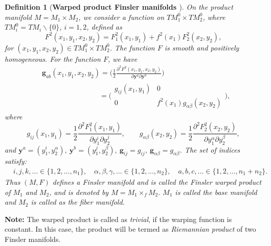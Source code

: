 \documentclass[pdflatex,sn-mathphys-num]{sn-jnl}%
\theoremstyle{thmstyleone}%
\theoremstyle{thmstyletwo}%
\theoremstyle{thmstylethree}%
\newtheorem{definition}{Definition}%
\begin{document}
\begin{definition} [\textbf{Warped product Finsler manifolds \cite[\boldmath p. $10$]{wlt}}]
  On the product manifold $M=M_1\times M_2$, we consider a function on $TM_1^0\times TM_2^0$, where $TM_i^0=TM_i\backslash \{0\}$, $i=1,2$, defined as
	\begin{equation}\label{FM}
		F^2(x_1,y_1,x_2,y_2)=F_1^2(x_1,y_1)+f^2(x_1)F_2^2(x_2,y_2),
	\end{equation}
	for $(x_1,y_1,x_2,y_2)\in TM_1^0\times TM_2^0$. The function $F$ is smooth and positively homogeneous. For the function $F$, we have
	\begin{align}
		&\nonumber\mathbf{g}_{ab}(x_1,y_1,x_2,y_2)=\Bigg(\frac{1}{2}\frac{\partial^2F^2(x_1,y_1,x_2,y_2)}{\partial \mathbf{y}^a\partial\mathbf{y}^b} \Bigg)\\&\quad\quad\quad\quad\quad\quad\quad\quad=\Bigg(\begin{matrix}
			g_{ij}(x_1,y_1) & 0\\
			0 & f^2(x_1)g_{\alpha\beta}(x_2,y_2)
		\end{matrix}\Bigg),
	\end{align}
	where 
	\begin{equation*}
		g_{ij}(x_1,y_1)=\frac{1}{2}\frac{\partial^2F_1^2(x_1,y_1)}{\partial y_1^i\partial y_2^j},\quad \quad  g_{\alpha\beta}(x_2,y_2)=\frac{1}{2}\frac{\partial^2F_2^2(x_2,y_2)}{\partial y_1^\alpha\partial y_2^\beta},
	\end{equation*}
	and $\mathbf{y}^a=(y_1^i,y_2^\alpha),\:\mathbf{y}^b=(y_1^j,y_2^\beta),\:\mathbf{g}_{ij}=g_{ij},\:\mathbf{g}_{\alpha\beta}=g_{\alpha\beta}$. The set of indices satisfy:
	\begin{align*}
		&i,j,k,...\in\{1,2,...,n_1\},\quad \alpha,\beta,\gamma,...\in\{1,2,...,n_2\},\quad a,b,c,...\in\{1,2,...,n_1+n_2\}.
	\end{align*}
	Thus $(M, F)$ defines a Finsler manifold and is called the {\it Finsler warped product} of  $M_1$ and $M_2$, and is denoted by $M=M_1\times_f M_2.$  $M_1$ is called  the base manifold and $M_2$ is called as the fiber manifold.  

 \end{definition}
	
\bigskip	
	
{\bf Note:} The warped product is called as {\it trivial}, if the warping function is constant. In this case, the product will
be termed as {\it Riemannian product} of two Finsler manifolds.\\ 
 
\end{document}
